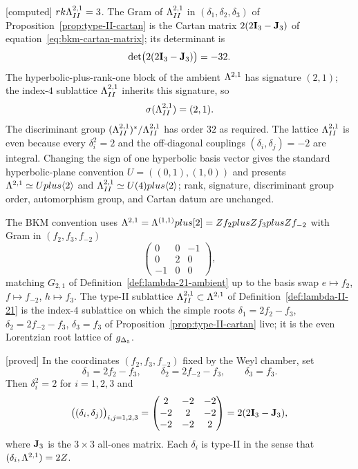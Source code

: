 \begin{verification}
\label{ver:II21-invariants}
\textnormal{[computed]}
$rk\Lambda_{II}^{2,1}=3$.  The Gram of $\Lambda_{II}^{2,1}$ in
$(\delta_1,\delta_2,\delta_3)$ of
Proposition~\ref{prop:type-II-cartan} is the Cartan matrix
$2(2\mathbf{I}_3-\mathbf{J}_3)$ of equation~\eqref{eq:bkm-cartan-matrix}; its
determinant is
\[
\det\bigl(2(2\mathbf{I}_3-\mathbf{J}_3)\bigr)=-32.
\]
The hyperbolic-plus-rank-one block of the ambient $\Lambda^{2,1}$ has
signature $(2,1)$; the index-$4$ sublattice $\Lambda_{II}^{2,1}$ inherits
this signature, so
\[
\sigma(\Lambda_{II}^{2,1})=(2,1).
\]
The discriminant group $(\Lambda_{II}^{2,1})^*/\Lambda_{II}^{2,1}$ has order
$32$ as required.  The lattice $\Lambda_{II}^{2,1}$ is even because every
$\delta_i^2=2$ and the off-diagonal couplings $(\delta_i,\delta_j)=-2$
are integral.  Changing the sign of one hyperbolic basis vector gives
the standard hyperbolic-plane convention \(U=((0,1),(1,0))\) and
presents \(\Lambda^{2,1}\simeq Uplus\langle 2\rangle\) and
$\Lambda_{II}^{2,1}\simeq U(4)plus\langle 2\rangle$; rank, signature,
discriminant group order, automorphism group, and Cartan datum are
unchanged.
\end{verification}

\begin{remark}
\label{rem:II21-vs-La21}
The BKM convention uses
$\Lambda^{2,1}=\Lambda^{(1,1)}plus[2]
=Z f_2plusZ f_3plusZ f_{-2}$
with Gram in $(f_2,f_3,f_{-2})$
\[
\begin{pmatrix}0&0&-1\\ 0&2&0\\ -1&0&0\end{pmatrix},
\]
matching $G_{2,1}$ of Definition~\ref{def:lambda-21-ambient} up to
the basis swap $e\mapsto f_2$, $f\mapsto f_{-2}$, $h\mapsto f_3$.
The type-II sublattice $\Lambda_{II}^{2,1}\subset\Lambda^{2,1}$ of
Definition~\ref{def:lambda-II-21} is the index-$4$ sublattice on
which the simple roots $\delta_1=2f_2-f_3$, $\delta_2=2f_{-2}-f_3$,
$\delta_3=f_3$ of Proposition~\ref{prop:type-II-cartan} live; it is
the even Lorentzian root lattice of ${g_{\Delta_5}}$.
\end{remark}

\begin{proposition}
\label{prop:type-II-cartan}
\textnormal{[proved]}
In the coordinates \((f_2,f_3,f_{-2})\) fixed by the Weyl chamber, set
\[
\delta_1=2f_2-f_3,\qquad
\delta_2=2f_{-2}-f_3,\qquad
\delta_3=f_3.
\]
Then $\delta_i^2=2$ for $i=1,2,3$ and
\[
\bigl((\delta_i,\delta_j)\bigr)_{i,j=1,2,3}
=\begin{pmatrix} 2&-2&-2\\ -2&2&-2\\ -2&-2&2\end{pmatrix}
=2(2\mathbf{I}_3-\mathbf{J}_3),
\]
where $\mathbf{J}_3$ is the $3\times 3$ all-ones matrix.  Each $\delta_i$ is
type-II in the sense that $(\delta_i,\Lambda^{2,1})=2Z$.
\end{proposition}

